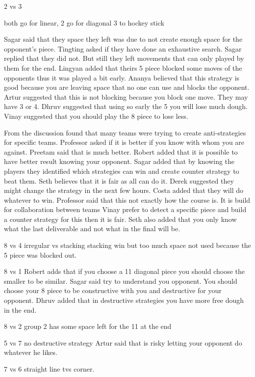 2 vs 3 

both go for linear, 2 go for diagonal 3 to hockey stick

Sagar said that they space they left was due to not create enough space for the opponent’s piece.
Tingting asked if they have done an exhaustive search.
Sagar replied that they did not. But still they left movements that can only played by them for the end.
Lingyan added that theirs 5 piece blocked some moves of the opponents thus it was 
played a bit early.
Ananya believed that this strategy is good because you are leaving space that no one can use and blocks the opponent.
Artur suggested that this is not blocking because you block one move. They may have 3 or 4.
Dhruv suggested that using so early the 5 you will lose much dough.
Vinay suggested that you should play the 8 piece to lose less.


From the discussion found that many teams were trying to create anti-strategies 
for specific teams.
Professor asked if it is better if you know with whom you are against.
Preetam said that is much better.
Robert added that it is possible to have better result knowing your opponent.
Sagar added that by knowing the players they identified which strategies can win and create counter strategy to beat them.
Seth believes that it is fair as all can do it.
Derek suggested they might change the strategy in the next few hours.
Costa added that they will do whatever to win.
Professor said that this not exactly how the course is. It is build for collaboration between teams
Vinay prefer to detect a specific piece and build a counter strategy for this then it is fair.
Seth also added that you only know what the last deliverable and not what in the final will be.


8 vs 4
irregular vs stacking
stacking win but too much space not used because the 5 piece was blocked out.


8 vs 1
Robert adds that if you choose a 11 diagonal piece you should choose the smaller to be similar.
Sagar said try to understand you opponent. You should choose your 8 piece to be constructive with you and destructive for your opponent.
Dhruv added that in destructive strategies you have more free dough in the end.

8 vs 2
group 2 has some space left for the 11 at the end


5 vs 7
no destructive strategy
Artur said that is risky letting your opponent do whatever he likes.


7 vs 6
straight line tvs corner.

